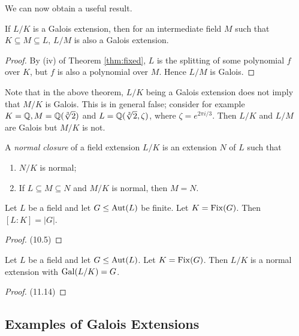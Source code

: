 We can now obtain a useful result.

\begin{theorem} \label{thm:galois-intermediate}
	If $L/K$ is a Galois extension, then for an intermediate field $M$ such that $K \subseteq M \subseteq L$, $L/M$ is also a Galois extension. 
\end{theorem}
\begin{proof}
	By (iv) of Theorem \ref{thm:fixed}, $L$ is the splitting of some polynomial $f$ over $K$, but $f$ is also a polynomial over $M$. Hence $L/M$ is Galois.
\end{proof}

Note that in the above theorem, $L/K$ being a Galois extension does not imply that $M/K$ is Galois. This is in general false; consider for example $K = \mathbb Q, M = \mathbb Q(\sqrt[3]{2})$ and $L = \mathbb Q(\sqrt[3]{2}, \zeta)$, where $\zeta = e^{2\pi i / 3}$. Then $L/K$ and $L/M$ are Galois but $M/K$ is not. 

\begin{definition}
   A \textit{normal closure} of a field extension $L / K$ is an extension $N$ of $L$ such that 
   \begin{enumerate}
       \item $N / K$ is normal;
       \item If $L \subseteq M \subseteq N$ and $M / K$ is normal, then $M = N$.
   \end{enumerate}
\end{definition}

\begin{theorem}
	Let $L$ be a field and let $G \le \operatorname{Aut}(L)$ be finite. Let $K = \operatorname{Fix}(G)$. Then $[L:K] =|G|$. 
\end{theorem}

\begin{proof}
	\TODO(10.5)
\end{proof}

\begin{theorem} \label{thm:fix-extension-normal}
	Let $L$ be a field and let $G \le \operatorname{Aut}(L)$. Let $K = \operatorname{Fix}(G)$. Then $L/K$ is a normal extension with $\operatorname{Gal}(L/K) = G$. 
\end{theorem}

\begin{proof}
	\TODO(11.14)
\end{proof}

\subsection{Examples of Galois Extensions}

